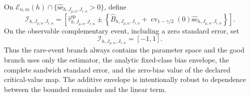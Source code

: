 On \(\mathcal E_{n,m}(h)\cap\{\widehat{\mathrm{se}}_{h,J_{\mu,n},J_{r,n}}>0\}\), define
\[
 \mathcal I_{h,J_{\mu,n},J_{r,n}}
 =\left[
 \widehat\tau^{\mathrm{sp}}_{h,J_{\mu,n},J_{r,n}}
 \pm
 \left\{\widehat B_{h,J_{\mu,n},J_{r,n}}
 +\operatorname{cv}_{1-\gamma/2}(0)
 \widehat{\mathrm{se}}_{h,J_{\mu,n},J_{r,n}}\right\}
 \right].
\]
On the observable complementary event, including a zero standard error, set
\[
 \mathcal I_{h,J_{\mu,n},J_{r,n}}=[-1,1].
\]
Thus the rare-event branch always contains the parameter space and the good branch uses only the estimator, the analytic fixed-class bias envelope, the complete sandwich standard error, and the zero-bias value of the declared critical-value map.  The additive envelope is intentionally robust to dependence between the bounded remainder and the linear term.